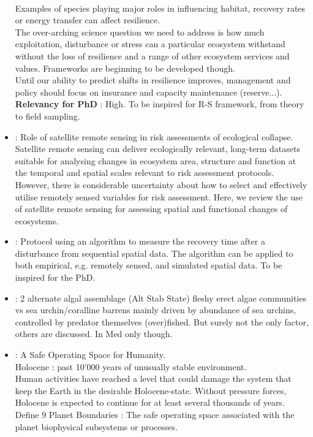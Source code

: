 \documentclass[]{report}
\begin{document}
\begin{itemize}
		\\Examples of species playing major roles in influencing habitat, recovery rates or energy transfer can affect resilience.
		\\The over-arching science question we need to address is how much exploitation, disturbance or stress can a particular ecosystem withstand without the loss of resilience and a range of other ecosystem services and values. Frameworks are beginning to be developed though.
		\\Until our ability to predict shifts in resilience improves, management and policy should focus on insurance and capacity maintenance (reserve...).
		\\\textbf{Relevancy for PhD} : High. To be inspired for R-S framework, from theory to field sampling.
		\item \cite{Murray2018} : Role of satellite remote sensing in risk assessments of ecological collapse.  Satellite remote sensing can deliver ecologically relevant, long-term datasets suitable for analysing changes in ecosystem area, structure and function at the temporal and spatial scales relevant to risk assessment protocols. However, there is considerable uncertainty about how to select and effectively utilise remotely sensed variables for risk assessment. Here, we review the use of satellite remote sensing for assessing spatial and functional changes of ecosystems.
		\item \cite{van2017timing} : Protocol using an algorithm to measure the recovery time after a disturbance from sequential spatial data. The algorithm can be applied to both empirical, e.g. remotely sensed, and simulated spatial data. To be inspired for the PhD.
		\item \cite{sala1998fishing} : 2 alternate algal assemblage (Alt Stab State) fleshy erect algae communities vs sea urchin/coralline barrens mainly driven by abundance of sea urchins, controlled by predator themselves (over)fished. But surely not the only factor, others are discussed. In Med only though.
		\item \cite{rockstrom2009safe} : A Safe Operating Space for Humanity.
		\\Holocene : past 10'000 years of unusually stable environment.
		\\Human activities have reached a level that could damage the system that keep the Earth in the desirable Holocene-state. Without pressure forces, Holocene is expected to continue for at least several thousands of years.
		\\Define 9 Planet Boundaries : The safe operating space associated with the planet biophysical subsystems or processes.

\end{itemize}
\end{document}
